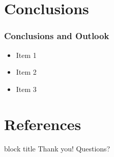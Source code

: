 \documentclass[c]{beamer}
\begin{document}
\section{Conclusions}
\begin{frame}[c]
\frametitle{Conclusions and Outlook}
	
	\begin{itemize}
		\item Item 1 \cite{Ebrahimi:2011}
		\item Item 2
		\item Item 3
	\end{itemize}

\end{frame}



\section*{References}
\begin{frame}[b]

	\vskip15pt
	\begin{beamercolorbox}[center,rounded=true,sep=2mm,shadow=true]{block title}
		\Large Thank you! Questions?	
	\end{beamercolorbox}

	
	\vskip25pt
	
	
	\vskip3pt
\end{frame}
\end{document}
